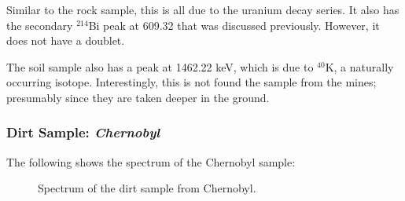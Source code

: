 \documentclass{article}
\begin{document}
Similar to the rock sample, this is all due to the uranium decay series. It also has the secondary $^{214}$Bi peak at 609.32 that was discussed previously. However, it does not have a doublet.

The soil sample also has a peak at 1462.22 keV, which is due to $^{40}$K, a naturally occurring isotope. Interestingly, this is not found the sample from the mines; presumably since they are taken deeper in the ground.

\pagebreak{}

\subsubsection{Dirt Sample: \textit{Chernobyl}}

The following shows the spectrum of the Chernobyl sample:

\begin{figure}[h!]
	\centering
	\scalebox{1}{}
	\caption{Spectrum of the dirt sample from Chernobyl.}
	\label{fig:Chernobyl}
\end{figure}


\begin{table}[h]
	\centering
	\caption{Values found using \cite{plotzki_2024_highresolution}.}
	\label{tab:Chernobyl}
\end{table}
\end{document}
